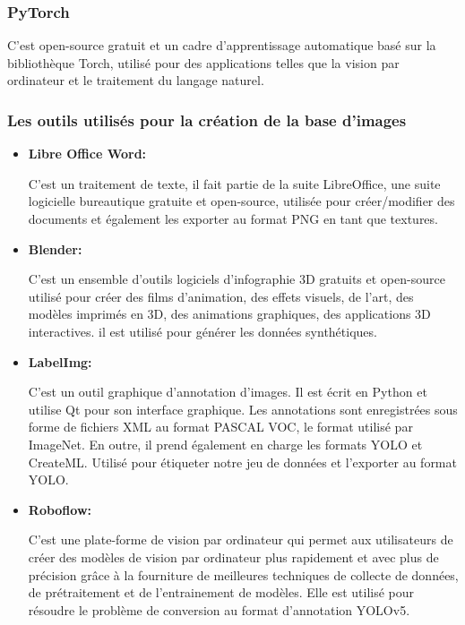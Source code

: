      \subsubsection{PyTorch} C'est open-source gratuit et un cadre d'apprentissage automatique basé sur la bibliothèque Torch, utilisé pour des applications telles que la vision par ordinateur et le traitement du langage naturel.
     
   \subsubsection{Les outils utilisés pour la création de la base d'images}
   \begin{itemize}
   \item \textbf{Libre Office Word: }
   
   C'est un traitement de texte, il fait partie de la suite LibreOffice, une suite logicielle bureautique gratuite et open-source,  utilisée pour créer/modifier des documents et également les exporter au format PNG en tant que textures.
   
   \item \textbf{Blender: }
   
C'est un ensemble d'outils logiciels d'infographie 3D gratuits et open-source utilisé pour créer des films d'animation, des effets visuels, de l'art, des modèles imprimés en 3D, des animations graphiques, des applications 3D interactives. il est utilisé pour générer les données synthétiques. 
    
   \item \textbf{LabelImg: }
   
C'est un outil graphique d'annotation d'images. Il est écrit en Python et utilise Qt pour son interface graphique. Les annotations sont enregistrées sous forme de fichiers XML au format PASCAL VOC, le format utilisé par ImageNet. En outre, il prend également en charge les formats YOLO et CreateML. Utilisé pour étiqueter notre jeu de données et l'exporter au format YOLO.   
  
   \item \textbf{Roboflow: }
   
C'est une plate-forme de vision par ordinateur qui permet aux utilisateurs de créer des modèles de vision par ordinateur plus rapidement et avec plus de précision grâce à la fourniture de meilleures techniques de collecte de données, de prétraitement et de l'entrainement de modèles. Elle est utilisé pour résoudre le problème de conversion au format d'annotation YOLOv5.     
   \end{itemize}
   
